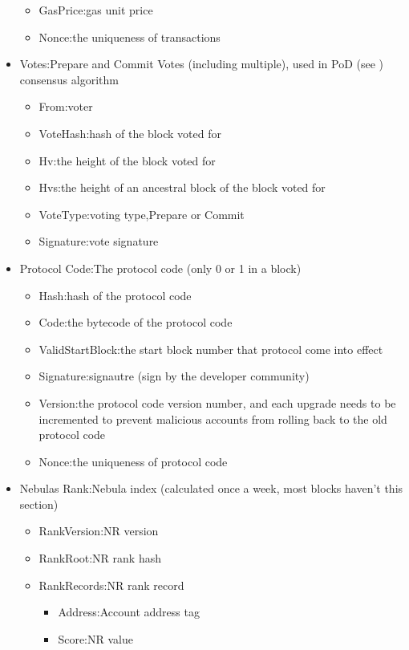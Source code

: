 \begin{itemize}
\begin{itemize}
		\item GasPrice:gas unit price
		\item Nonce:the uniqueness of transactions
		\end{itemize}
	\item Votes:Prepare and Commit Votes (including multiple), used in PoD (see ) consensus algorithm
		\begin{itemize}
		\item From:voter
		\item VoteHash:hash of the block voted for
		\item Hv:the height of the block voted for
		\item Hvs:the height of an ancestral block of the block voted for
		\item VoteType:voting type,Prepare or Commit
		\item Signature:vote signature
		\end{itemize}
	\item Protocol Code:The protocol code (only 0 or 1 in a block)
		\begin{itemize}
		\item Hash:hash of the protocol code
		\item Code:the bytecode of the protocol code
		\item ValidStartBlock:the start block number that protocol come into effect
		\item Signature:signautre (sign by the developer community)
		\item Version:the protocol code version number, and each upgrade needs to be incremented to prevent malicious accounts from rolling back to the old protocol code
		\item Nonce:the uniqueness of protocol code
		\end{itemize}
	\item Nebulas Rank:Nebula index (calculated once a week, most blocks haven't this section)
		\begin{itemize}
		\item RankVersion:NR version
		\item RankRoot:NR rank hash
		\item RankRecords:NR rank record
			\begin{itemize}
				\item Address:Account address tag
				\item Score:NR value
			\end{itemize}
		\end{itemize}
\end{itemize}

